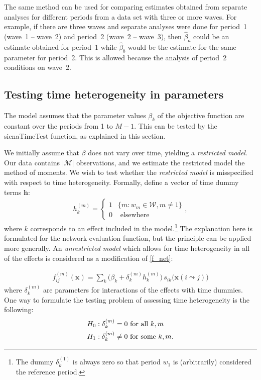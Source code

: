 \documentclass[a4paper,fleqn,11pt]{article}
\newcommand{\+}{\, + \,}
\newcommand{\sfn}[1]{\textsf{#1}}
\begin{document}
The same method can be used for comparing estimates obtained from
separate analyses for different periods from a data set with three
or more waves. For example, if there are three waves and separate analyses
were done for period~1 (wave~1 -- wave~2) and  period~2 (wave~2 -- wave~3),
then $\hat\beta_a$ could be an estimate obtained for period~1 while
$\hat\beta_b$ would be the estimate for the same parameter for period~2.
This is allowed because the analysis of period~2 conditions on wave~2.


\newpage
\subsection{Testing time heterogeneity in parameters}
\label{S_timetest2}

The model assumes that the parameter values $\beta_k$
of the objective function are constant over the periods from 1 to $M-1$.
This can be tested by the \sfn{sienaTimeTest} function,
as explained in this section.

We initially assume that $\beta$ does not vary over time, yielding a
\emph{restricted model}. Our data contains $|\mathcal{M}|$ observations, and we
estimate the restricted model the method of moments. We wish to test whether the
\emph{restricted model} is misspecified with respect to time
heterogeneity. Formally, define a vector of time dummy terms $\mathbf{h}$:
\begin{align}
h_k^{(m)}=\left\{
\begin{array}{ll}
1& \{m : w_m \in \mathcal{W}, m \neq 1\}\\
0& \mbox{~elsewhere~}
\end{array}
\right . ,
\end{align}
where $k$ corresponds to an effect included in the model.\footnote{The dummy
  $\delta_k^{(1)}$ is always zero so that period $w_1$ is (arbitrarily)
  considered the reference period.} The explanation here
is formulated for the network evaluation function,
but the principle can be applied more generally.
An \emph{unrestricted model} which allows
for time heterogeneity in all of the effects is considered as a modification of
\eqref{f_net}:

\begin{align}
f^{(m)}_{ij}(\mathbf{x})= \sum_k \Big(\beta_k + \delta_k^{(m)} h_k^{(m)}\Big)
           \, s_{ik}\big(\mathbf{x}(i \leadsto j)\big)
\label{eq:fmij2}
\end{align}
where $\delta_k^{(m)}$ are parameters for interactions of the effects
with time dummies. One way
to formulate the testing problem of assessing time heterogeneity is the
following:
\begin{align}
H_0:\delta_k^{(m)} = 0 & \mbox{~for all~} k,m \notag\\
H_1:\delta_k^{(m)} \neq 0 & \mbox{ for some } k,m .
\label{hyptest}
\end{align}
\end{document}

